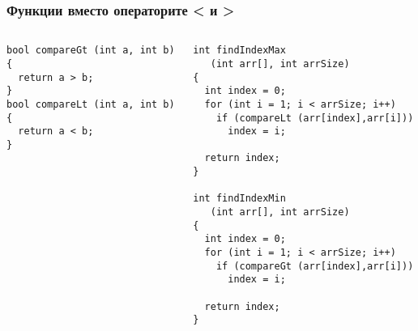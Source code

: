 \documentclass{beamer}
\begin{document}
\begin{frame}[fragile]
\frametitle{Функции вместо операторите < и >}

\begin{columns}[t]
  \begin{column}{0.5\textwidth}

\begin{flushleft}
\begin{lstlisting}
bool compareGt (int a, int b)
{
  return a > b;
}
bool compareLt (int a, int b)
{
  return a < b;
}
\end{lstlisting}  
\end{flushleft}

  \end{column}
  \begin{column}{0.5\textwidth}

\begin{flushleft}
\begin{lstlisting}
int findIndexMax  
   (int arr[], int arrSize)
{
  int index = 0;
  for (int i = 1; i < arrSize; i++)
    if (compareLt (arr[index],arr[i]))
      index = i;

  return index;
}

int findIndexMin 
   (int arr[], int arrSize)
{
  int index = 0;
  for (int i = 1; i < arrSize; i++)
    if (compareGt (arr[index],arr[i]))
      index = i;

  return index;
}
\end{lstlisting}  
\end{flushleft}
  \end{column}
\end{columns}

\end{frame}
\end{document}
